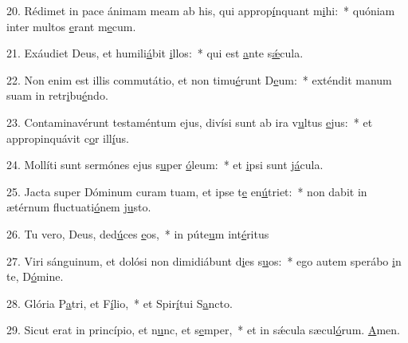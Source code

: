 20. Rédimet in pace ánimam meam ab his, qui approp\uline{í}nquant m\uline{i}hi:~* quóniam inter multos \uline{e}rant m\uline{e}cum.\par 
21. Exáudiet Deus, et humili\uline{á}bit \uline{i}llos:~* qui est \uline{a}nte s\uline{ǽ}cula.\par 
22. Non enim est illis commutátio, et non timu\uline{é}runt D\uline{e}um:~* exténdit manum suam in retr\uline{i}bu\uline{é}ndo.\par 
23. Contaminavérunt testaméntum ejus, divísi sunt ab ira v\uline{u}ltus \uline{e}jus:~* et appropinquávit c\uline{o}r ill\uline{í}us.\par 
24. Mollíti sunt sermónes ejus s\uline{u}per \uline{ó}leum:~* et \uline{i}psi sunt j\uline{á}cula.\par 
25. Jacta super Dóminum curam tuam, et ipse t\uline{e} en\uline{ú}triet:~* non dabit in ætérnum fluctuati\uline{ó}nem j\uline{u}sto.\par 
26. Tu vero, Deus, ded\uline{ú}ces \uline{e}os,~* in púte\uline{u}m int\uline{é}ritus\par 
27. Viri sánguinum, et dolósi non dimidiábunt d\uline{i}es s\uline{u}os:~* ego autem sperábo \uline{i}n te, D\uline{ó}mine.\par 
28. Glória P\uline{a}tri, et F\uline{í}lio,~* et Spir\uline{í}tui S\uline{a}ncto.\par 
29. Sicut erat in princípio, et n\uline{u}nc, et s\uline{e}mper,~* et in sǽcula sæcul\uline{ó}rum. \uline{A}men.\par 
